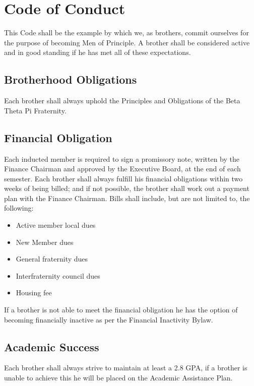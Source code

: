 \chapter{Code of Conduct}
\label{cha:code-of-conduct}

This Code shall be the example by which we, as brothers, commit ourselves for
the purpose of becoming Men of Principle.
A brother shall be considered active and in good standing if he has met all of
these expectations.

\section{Brotherhood Obligations}
\label{sec:brotherhood-obligations}

Each brother shall always uphold the Principles and Obligations of the Beta
Theta Pi Fraternity.

\section{Financial Obligation}
\label{sec:financial-obligation}

Each inducted member is required to sign a promissory note, written by the
Finance Chairman and approved by the Executive Board, at the end of each
semester.
Each brother shall always fulfill his financial obligations within two weeks of
being billed; and if not possible, the brother shall work out a payment plan
with the Finance Chairman.
Bills shall include, but are not limited to, the following:

\begin{itemize}
	\item Active member local dues
	\item New Member dues
	\item General fraternity dues
	\item Interfraternity council dues
	\item Housing fee
\end{itemize}

If a brother is not able to meet the financial obligation he has the option of
becoming financially inactive as per the Financial Inactivity Bylaw.

\section{Academic Success}
\label{sec:academic-success}

Each brother shall always strive to maintain at least a 2.8 GPA, if a brother is
unable to achieve this he will be placed on the Academic Assistance Plan.

